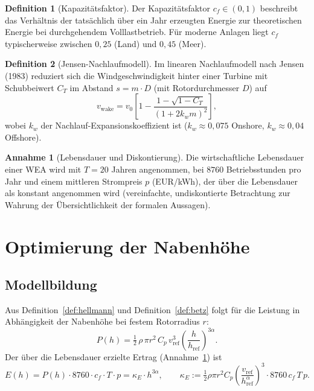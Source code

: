 ﻿\documentclass[a4paper,12pt]{article}
\theoremstyle{definition}
\newtheorem{definition}{Definition}
\newtheorem{annahme}{Annahme}
\begin{document}
\begin{definition}[Kapazitätsfaktor]
\label{def:cf}
Der Kapazitätsfaktor $c_f \in (0,1)$ beschreibt das Verhältnis der tatsächlich über ein Jahr erzeugten Energie zur theoretischen Energie bei durchgehendem Volllastbetrieb. Für moderne Anlagen liegt $c_f$ typischerweise zwischen $0{,}25$ (Land) und $0{,}45$ (Meer).
\end{definition}

\begin{definition}[Jensen-Nachlaufmodell]
\label{def:jensen}
Im linearen Nachlaufmodell nach Jensen (1983) reduziert sich die Windgeschwindigkeit hinter einer Turbine mit Schubbeiwert $C_T$ im Abstand $s = m \cdot D$ (mit Rotordurchmesser $D$) auf
\[
v_{\mathrm{wake}} = v_0 \left[1 - \frac{1-\sqrt{1-C_T}}{(1 + 2 k_w m)^2}\right],
\]
wobei $k_w$ der Nachlauf-Expansionskoeffizient ist ($k_w \approx 0{,}075$ Onshore, $k_w \approx 0{,}04$ Offshore).
\end{definition}

\begin{annahme}[Lebensdauer und Diskontierung]
\label{ann:lebensdauer}
Die wirtschaftliche Lebensdauer einer WEA wird mit $T = 20$ Jahren angenommen, bei $8760$ Betriebsstunden pro Jahr und einem mittleren Strompreis $p$ (EUR/kWh), der über die Lebensdauer als konstant angenommen wird (vereinfachte, undiskontierte Betrachtung zur Wahrung der Übersichtlichkeit der formalen Aussagen).
\end{annahme}

\section{Optimierung der Nabenhöhe}

\subsection{Modellbildung}

Aus Definition~\ref{def:hellmann} und Definition~\ref{def:betz} folgt für die Leistung in Abhängigkeit der Nabenhöhe bei festem Rotorradius $r$:
\[
P(h) = \tfrac{1}{2}\,\rho\, \pi r^2\, C_p\, v_{\mathrm{ref}}^3 \left(\frac{h}{h_{\mathrm{ref}}}\right)^{3\alpha}.
\]
Der über die Lebensdauer erzielte Ertrag (Annahme~\ref{ann:lebensdauer}) ist
\[
E(h) = P(h) \cdot 8760 \cdot c_f \cdot T \cdot p = \kappa_E \cdot h^{3\alpha}, \qquad \kappa_E := \tfrac{1}{2}\rho \pi r^2 C_p \left(\frac{v_{\mathrm{ref}}}{h_{\mathrm{ref}}^{\alpha}}\right)^3 \cdot 8760\, c_f\, T\, p.
\]
\end{document}
